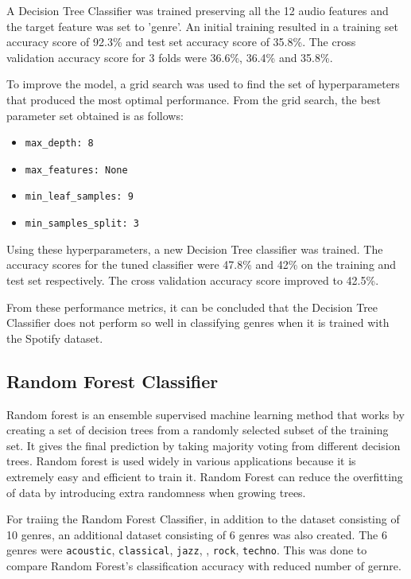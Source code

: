 \documentclass[conference]{IEEEtran}
\begin{document}
A Decision Tree Classifier was trained preserving all the 12 audio features and the target feature was set to 'genre'. An initial training resulted in a training set accuracy score of 92.3\% and test set accuracy score of 35.8\%. The cross validation accuracy score for 3 folds were 36.6\%, 36.4\% and 35.8\%.

To improve the model, a grid search was used to find the set of hyperparameters that produced the most optimal performance. From the grid search, the best parameter set obtained is as follows:
\begin{itemize}
\item \texttt{max\_depth: 8}
\item \texttt{max\_features: None}
\item \texttt{min\_leaf\_samples: 9}
\item \texttt{min\_samples\_split: 3}
\end{itemize}

Using these hyperparameters, a new Decision Tree classifier was trained. The accuracy scores for the tuned classifier were 47.8\% and 42\% on the training and test set respectively. The cross validation accuracy score improved to 42.5\%.

From these performance metrics, it can be concluded that the Decision Tree Classifier does not perform so well in classifying genres when it is trained with the Spotify dataset.

\subsection{Random Forest Classifier}
\label{sec:org802413d}

Random forest \cite{geron2019hands} is an ensemble supervised machine learning method that works by creating a set of decision trees from a randomly selected subset of the training set. It gives the final prediction by taking majority voting from different decision trees. Random forest is used widely in various applications because it is extremely easy and efficient to train it. Random Forest can reduce the overfitting of data by introducing extra randomness when growing trees.

For traiing the Random Forest Classifier, in addition to the dataset consisting of 10 genres, an additional dataset consisting of 6 genres was also created. The 6 genres were \texttt{acoustic}, \texttt{classical}, \texttt{jazz}, , \texttt{rock}, \texttt{techno}. This was done to compare Random Forest's classification accuracy with reduced number of gernre.
\end{document}
